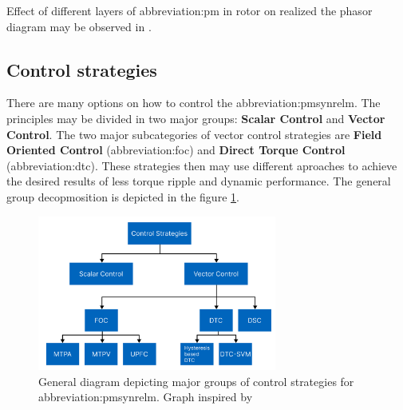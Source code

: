\documentclass[a4paper, twoside, 11pt]{article}
\begin{document}
    \par
    Effect of different layers of \gls{abbreviation:pm} in rotor on realized the phasor diagram may be observed in \cite{huynh-design-and-analysis-of-perm-as-synch-rel-m}.

    \subsection{Control strategies}

        There are many options on how to control the \gls{abbreviation:pmsynrelm}. The principles may be divided in two major groups: \textbf{Scalar Control} and \textbf{Vector Control}. The two major subcategories of vector control strategies are \textbf{Field Oriented Control} (\gls{abbreviation:foc}) and \textbf{Direct Torque Control} (\gls{abbreviation:dtc}). These strategies then may use different aproaches to achieve the desired results of less torque ripple and dynamic performance. \cite{dwivedi-review-on-control-strategies-of-permanent-magnet-assisted-synchronous-reluctance-motor-drive} The general group decopmosition is depicted in the figure \ref{fig:pmsynrelm-control-strategies}.

        \begin{figure}[htbp!]
            \centering
            \includegraphics[width=0.70\textwidth]{src/png/pmsynrelm-control-strategies.png}
            \caption{General diagram depicting major groups of control strategies for \gls{abbreviation:pmsynrelm}. Graph inspired by \cite{dwivedi-review-on-control-strategies-of-permanent-magnet-assisted-synchronous-reluctance-motor-drive}}
            \label{fig:pmsynrelm-control-strategies}
        \end{figure}
\end{document}

